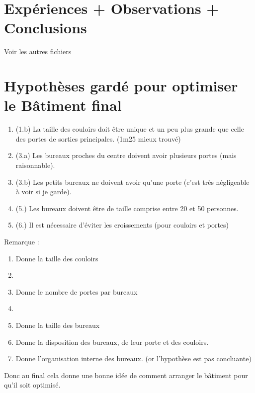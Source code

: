 \documentclass[12pt]{article}
\begin{document}
\section{Expériences + Observations + Conclusions}

Voir les autres fichiers

\section{Hypothèses gardé pour optimiser le Bâtiment final}

\begin{enumerate}
    \item (1.b) La taille des couloirs doit être unique et un peu plus grande que celle des portes de sorties principales. (1m25 mieux trouvé)
    \item (3.a) Les bureaux proches du centre doivent avoir plusieurs portes (mais raisonnable).
    \item (3.b) Les petits bureaux ne doivent avoir qu'une porte (c'est très négligeable à voir si je garde).
    \item (5.) Les bureaux doivent être de taille comprise entre 20 et 50 personnes.
    \item (6.) Il est nécessaire d'éviter les croissements (pour couloirs et portes)
\newline\newline\end{enumerate}

Remarque :
\begin{enumerate}
    \item Donne la taille des couloirs
    \item 
    \item Donne le nombre de portes par bureaux
    \item 
    \item Donne la taille des bureaux
    \item Donne la disposition des bureaux, de leur porte et des couloirs.
    \item Donne l'organisation interne des bureaux. (or l'hypothèse est pas concluante)
\end{enumerate}

Donc au final cela donne une bonne idée de comment arranger le bâtiment pour qu'il soit optimisé.
\end{document}
